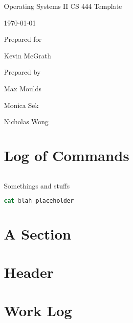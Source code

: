 \documentclass[onecolumn, draftclsnofoot,10pt, compsoc]{IEEEtran}
\def \GroupMemberOne{			Max Moulds}
\def \GroupMemberTwo{			Monica Sek}
\def \GroupMemberThree{			Nicholas Wong}
\def \ProfessorPerson{		Kevin McGrath}
\def \DocType{		CS 444 Template
				}
\newcommand{\NameSigPair}[1]{\par
\makebox[2.75in][r]{#1} \hfil 	\makebox[3.25in]{\makebox[2.25in]{\hrulefill} \hfill		\makebox[.75in]{\hrulefill}}
\par\vspace{-12pt} \textit{\tiny\noindent
\makebox[2.75in]{} \hfil		\makebox[3.25in]{\makebox[2.25in][r]{Signature} \hfill	\makebox[.75in][r]{Date}}}}
\begin{document}
\begin{titlepage}
    \begin{singlespace}
        \hfill
        \par\vspace{.2in}
        \centering
        \scshape{
            \huge Operating Systems II \DocType \par
            {\large\today}\par
            \vspace{.5in}
            \vfill
            \vspace{5pt}
						{\large Prepared for }\par
						\ProfessorPerson\par
            {\large Prepared by }\par
            \GroupMemberOne\par
						\GroupMemberTwo\par
						\GroupMemberThree\par
            \vspace{5pt}
            \vspace{20pt}
        }
        \begin{abstract}
       		This document is the writeup for homework(s) from Operating Systems II Spring term 2018, written by Group 20.
					\end{abstract}
    \end{singlespace}
\end{titlepage}
\newpage
{}
\tableofcontents
\clearpage

\section{Log of Commands}

\begin{lstlisting}[language=csh]

\end{lstlisting}

Somethings and stuffs
\begin{lstlisting}[language=csh]
cat blah placeholder
\end{lstlisting}

\section{A Section}


\newpage
\section{Header}

\section{Work Log}
\end{document}
